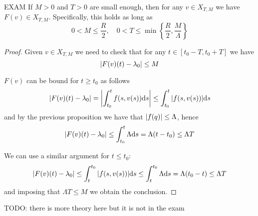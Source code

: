 \documentclass[12pt]{extarticle}
\begin{document}
\begin{proposition}{EXAM}{}
    If $M > 0$ and $T > 0$ are small enough, then for any $v \in X_{T, M}$ we have
    $F(v) \in X_{T, M}$.
    Specifically, this holds as long as
    \begin{equation}
        0 < M \leq \frac{R}{2}, \quad 0 < T \leq \min \left\{ \frac{R}{2}, \frac{M}{\Lambda} \right\}
    \end{equation}
\end{proposition}
\begin{proof}
    Given $v \in X_{T, M}$ we need to check that for any $t \in [t_0 - T, t_0 + T]$ we have
    \begin{equation}
        \abs{F(v)(t) - \lambda_0} \leq M
    \end{equation}

    $F(v)$ can be bound for $t \geq t_0$ as follows
    \begin{equation}
        \abs{F(v)(t) - \lambda_0} = \abs{\int_{t_0}^t f(s, v(s)) \dd s} \leq \int_{t_0}^t \abs{f(s, v(s))} \dd s
    \end{equation}
    and by the previous proposition we have that $\abs{f(q)} \leq \Lambda$, hence
    \begin{equation}
        \abs{F(v)(t)-\lambda_0} \leq \int_{t_0}^t \Lambda \dd s = \Lambda (t-t_0) \leq \Lambda T
    \end{equation}

    We can use a similar argument for $t \leq t_0$:
    \begin{equation}
        \abs{F(v)(t)-\lambda_0} \leq \int^{t_0}_t \abs{f(s, v(s))} \dd s \leq \int^{t_0}_t \Lambda \dd s = \Lambda (t_0-t) \leq \Lambda T
    \end{equation}
    and imposing that $\Lambda T \leq M$ we obtain the conclusion.
\end{proof}

TODO: there is more theory here but it is not in the exam
\end{document}
